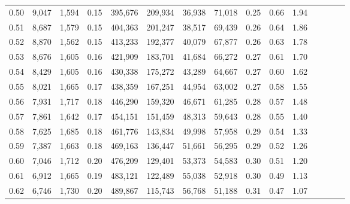 \begin{tabular}{rrrcrrrrrrrrrrr}
0.50 &   9,047 &  1,594 &                                       0.15 &  395,676 &  209,934 &   36,938 &   71,018 &  0.25 &  0.66 &                         1.94 \\
0.51 &   8,687 &  1,579 &                                       0.15 &  404,363 &  201,247 &   38,517 &   69,439 &  0.26 &  0.64 &                         1.86 \\
0.52 &   8,870 &  1,562 &                                       0.15 &  413,233 &  192,377 &   40,079 &   67,877 &  0.26 &  0.63 &                         1.78 \\
0.53 &   8,676 &  1,605 &                                       0.16 &  421,909 &  183,701 &   41,684 &   66,272 &  0.27 &  0.61 &                         1.70 \\
0.54 &   8,429 &  1,605 &                                       0.16 &  430,338 &  175,272 &   43,289 &   64,667 &  0.27 &  0.60 &                         1.62 \\
0.55 &   8,021 &  1,665 &                                       0.17 &  438,359 &  167,251 &   44,954 &   63,002 &  0.27 &  0.58 &                         1.55 \\
0.56 &   7,931 &  1,717 &                                       0.18 &  446,290 &  159,320 &   46,671 &   61,285 &  0.28 &  0.57 &                         1.48 \\
0.57 &   7,861 &  1,642 &                                       0.17 &  454,151 &  151,459 &   48,313 &   59,643 &  0.28 &  0.55 &                         1.40 \\
0.58 &   7,625 &  1,685 &                                       0.18 &  461,776 &  143,834 &   49,998 &   57,958 &  0.29 &  0.54 &                         1.33 \\
0.59 &   7,387 &  1,663 &                                       0.18 &  469,163 &  136,447 &   51,661 &   56,295 &  0.29 &  0.52 &                         1.26 \\
0.60 &   7,046 &  1,712 &                                       0.20 &  476,209 &  129,401 &   53,373 &   54,583 &  0.30 &  0.51 &                         1.20 \\
0.61 &   6,912 &  1,665 &                                       0.19 &  483,121 &  122,489 &   55,038 &   52,918 &  0.30 &  0.49 &                         1.13 \\
0.62 &   6,746 &  1,730 &                                       0.20 &  489,867 &  115,743 &   56,768 &   51,188 &  0.31 &  0.47 &                         1.07 \\

\end{tabular}
